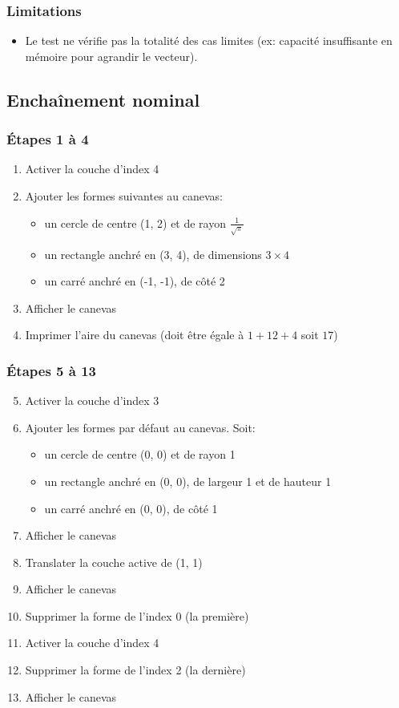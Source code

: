 \documentclass[a11paper, 11pt]{article}
\begin{document}
\subsubsection{Limitations}

\begin{itemize}
  \item Le test ne vérifie pas la totalité des cas limites
    (ex: capacité insuffisante en mémoire pour agrandir le vecteur).
\end{itemize}


\subsection{Enchaînement nominal}

\subsubsection{Étapes 1 à 4}
\begin{enumerate}
  \item Activer la couche d'index 4
  \item Ajouter les formes suivantes au canevas:
    \begin{itemize}
      \item un cercle de centre (1, 2) et de rayon $\frac{1}{\sqrt{\pi}}$
      \item un rectangle anchré en (3, 4), de dimensions $3\times4$
      \item un carré anchré en (-1, -1), de côté 2
    \end{itemize}
  \item Afficher le canevas
  \item Imprimer l'aire du canevas (doit être égale à $1+12+4$ soit $17$)
\end{enumerate}

\subsubsection{Étapes 5 à 13}
\begin{enumerate}
  \setcounter{enumi}{4}
  \item Activer la couche d'index 3
  \item Ajouter les formes par défaut au canevas. Soit:
  \begin{itemize}
    \item un cercle de centre (0, 0) et de rayon 1
    \item un rectangle anchré en (0, 0), de largeur 1 et de hauteur 1
    \item un carré anchré en (0, 0), de côté 1
  \end{itemize}
  \item Afficher le canevas
  \item Translater la couche active de (1, 1)
  \item Afficher le canevas
  \item Supprimer la forme de l'index 0 (la première)
  \item Activer la couche d'index 4
  \item Supprimer la forme de l'index 2 (la dernière)
  \item Afficher le canevas
\end{enumerate}
\end{document}
